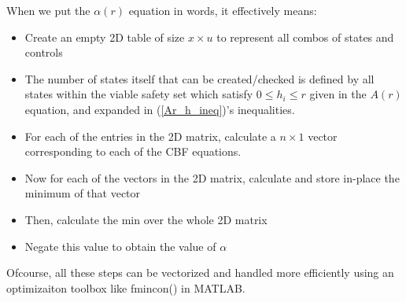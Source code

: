 \documentclass[journal, onecolumn]{IEEEtran} %
\begin{document}
When we put the $\alpha(r)$ equation in words, it effectively means:
\begin{itemize}
    \item Create an empty 2D table of size $x \times u$ to represent all combos of states and controls
    \item The number of states itself that can be created/checked is defined by all states within the 
    viable safety set which satisfy $0 \leq h_i \leq r$ given in the $A(r)$ equation, and expanded in (\ref{Ar_h_ineq})'s inequalities.
    \item For each of the entries in the 2D matrix, calculate a $n\times 1$ vector corresponding to each of the CBF equations.
    \item Now for each of the vectors in the 2D matrix, calculate and store in-place the minimum of that vector
    \item Then, calculate the min over the whole 2D matrix
    \item Negate this value to obtain the value of $\alpha$
\end{itemize}
Ofcourse, all these steps can be vectorized and handled more efficiently using an optimizaiton toolbox like fmincon() in MATLAB.
\end{document}
